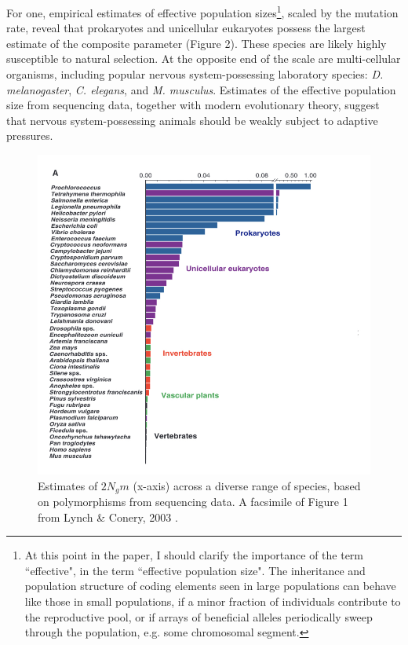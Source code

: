 \documentclass{article}
\begin{document}
For one, empirical estimates of effective population sizes\footnote{At this point in the paper, I should clarify the importance of the term ``effective", in the term ``effective population size". The inheritance and population structure of coding elements seen in large populations can behave like those in small populations, if a minor fraction of individuals contribute to the reproductive pool, or if arrays of beneficial alleles periodically sweep through the population, e.g. some chromosomal segment.}, scaled by the mutation rate, reveal that prokaryotes and unicellular eukaryotes possess the largest estimate of the composite parameter (Figure 2). These species are likely highly susceptible to natural selection. At the opposite end of the scale are multi-cellular organisms, including popular nervous system-possessing laboratory species: \textit{D. melanogaster}, \textit{C. elegans}, and \textit{M. musculus}. Estimates of the effective population size from sequencing data, together with modern evolutionary theory, suggest that nervous system-possessing animals should be weakly subject to adaptive pressures. 

\begin{figure}[htp]
\centering
\includegraphics[width=10 cm]{fig_2.jpeg}
\caption{Estimates of $2N_g m$ (x-axis) across a diverse range of species, based on polymorphisms from sequencing data. A facsimile of Figure 1 from Lynch \& Conery, 2003 \cite{Lynch_Conery_2003}.}
\end{figure}
\end{document}
